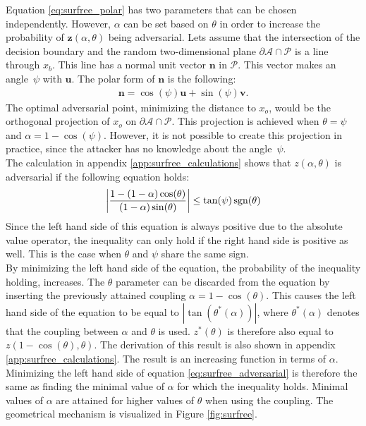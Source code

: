 Equation \ref{eq:surfree_polar} has two parameters that can be chosen independently. However, $\alpha$ can be set based on $\theta$ in order to increase the probability of $\mathbf{z}(\alpha, \theta)$ being adversarial. Lets assume that the intersection of the decision boundary and the random two-dimensional plane $\partial\mathcal{A}\cap\mathcal{P}$ is a line through $x_b$. This line has a normal unit vector $\mathbf{n}$ in $\mathcal{P}$. This vector makes an angle~$\psi$ with $\mathbf{u}$. The polar form of $\mathbf{n}$ is the following:
\begin{align}
\mathbf{n} = \cos(\psi)\mathbf{u} + \sin(\psi)\mathbf{v}. \label{eq:surfree_n}
\end{align}
The optimal adversarial point, minimizing the distance to $x_o$, would be the orthogonal projection of $x_o$ on $\partial\mathcal{A}\cap\mathcal{P}$. This projection is achieved when $\theta = \psi$ and $\alpha = 1 - \cos(\psi)$. However, it is not possible to create this projection in practice, since the attacker has no knowledge about the angle~$\psi$.\\

The calculation in appendix \ref{app:surfree_calculations} shows that $z(\alpha, \theta)$ is adversarial if the following equation holds:
\begin{align}
\left| \frac{1 - (1-\alpha)\cos(\theta)}{(1-\alpha)\sin(\theta)}\right| \leq \tan(\psi)\operatorname{sgn}(\theta) \label{eq:surfree_adversarial}
\end{align}
Since the left hand side of this equation is always positive due to the absolute value operator, the inequality can only hold if the right hand side is positive as well. This is the case when $\theta$ and $\psi$ share the same sign.\\

By minimizing the left hand side of the equation, the probability of the inequality holding, increases. The $\theta$ parameter can be discarded from the equation by inserting the previously attained coupling $\alpha = 1 - \cos(\theta)$. This causes the left hand side of the equation to be equal to $|\tan(\theta^*(\alpha))|$, where $\theta^*(\alpha)$ denotes that the coupling between $\alpha$ and $\theta$ is used. $z^*(\theta)$ is therefore also equal to $z(1-\cos(\theta), \theta)$. The derivation of this result is also shown in appendix \ref{app:surfree_calculations}. The result is an increasing function in terms of $\alpha$. Minimizing the left hand side of equation \ref{eq:surfree_adversarial} is therefore the same as finding the minimal value of $\alpha$ for which the inequality holds. Minimal values of $\alpha$ are attained for higher values of $\theta$ when using the coupling. The geometrical mechanism is visualized in Figure \ref{fig:surfree}.\\

